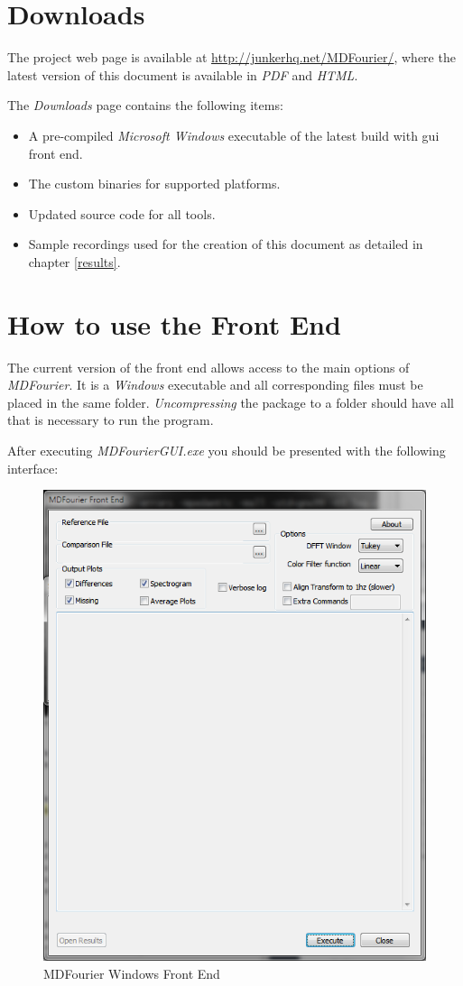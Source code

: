 \documentclass[10pt,a4paper]{report}
\begin{document}
\begin{appendices}
	
\chapter{Downloads}
\label{downloads}

The project web page is available at \url{http://junkerhq.net/MDFourier/}, where the latest version of this document is available in \textit{PDF} and \textit{HTML}.

The \textit{Downloads} page contains the following items:
\begin{itemize}
	\item A pre-compiled \textit{Microsoft Windows} executable of the latest build with \acrshort{gui} front end.
	\item The custom binaries for supported platforms.
	\item Updated source code for all tools.
	\item Sample recordings used for the creation of this document as detailed in chapter \ref{results}.
\end{itemize}
	
\chapter{How to use the Front End}
\label{usinggui}
The current version of the front end allows access to the main options of \textit{MDFourier}. It is a \textit{Windows} executable and all corresponding files must be placed in the same folder. \textit{Uncompressing} the package to a folder should have all that is necessary to run the program.

After executing \textit{MDFourierGUI.exe} you should be presented with the following interface:

\begin{figure}[H]
	\centering
	\includegraphics[width=0.6\linewidth]{images/GUI/GUI1.png}
	\caption[Front End]{MDFourier Windows Front End}
	\label{fig:gui1}
\end{figure}


\end{appendices}
\end{document}
